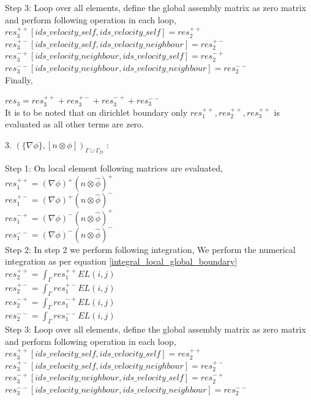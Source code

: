 \documentclass[a4paper]{book}
\begin{document}
Step 3: Loop over all elements, define the global assembly matrix as zero matrix and perform following operation in each loop,
\\
$res_3^{++}[ids\_velocity\_self,ids\_velocity\_self] = res_2^{++}$\\
$res_3^{+-}[ids\_velocity\_self,ids\_velocity\_neighbour] = res_2^{+-}$\\
$res_3^{-+}[ids\_velocity\_neighbour,ids\_velocity\_self] = res_2^{-+}$\\
$res_3^{--}[ids\_velocity\_neighbour,ids\_velocity\_neighbour] = res_2^{--}$\\

Finally,

$res_3 = res_3^{++} + res_3^{+-} + res_3^{-+} + res_3^{--}$\\

It is to be noted that on dirichlet boundary only $res_1^{++}, res_2^{++}, res_3^{++}$ is evaluated as all other terms are zero.

3. $(\lbrace \nabla \phi \rbrace, [n \otimes \phi])_{\Gamma \cup \Gamma_D}$ :

Step 1: On local element following matrices are evaluated,\\

$res_1^{++} = (\nabla \phi)^+ (n \otimes \hat{\phi})^+$\\
$res_1^{+-} = (\nabla \phi)^+ (n \otimes \hat{\phi})^-$\\
$res_1^{-+} = (\nabla \phi)^- (n \otimes \hat{\phi})^+$\\
$res_1^{--} = (\nabla \phi)^- (n \otimes \hat{\phi})^-$\\

Step 2: In step 2 we perform following integration, 
We perform the numerical integration as per equation \ref{integral_local_global_boundary}
\\ 
$res_2^{++} = \int_{\Gamma} res_1^{++} EL(i,j)$\\
$res_2^{+-} = \int_{\Gamma} res_1^{+-} EL(i,j)$\\
$res_2^{-+} = \int_{\Gamma} res_1^{-+} EL(i,j)$\\
$res_2^{--} = \int_{\Gamma} res_1^{--} EL(i,j)$\\

Step 3: Loop over all elements, define the global assembly matrix as zero matrix and perform following operation in each loop,
\\
$res_3^{++}[ids\_velocity\_self,ids\_velocity\_self] = res_2^{++}$\\
$res_3^{+-}[ids\_velocity\_self,ids\_velocity\_neighbour] = res_2^{+-}$\\
$res_3^{-+}[ids\_velocity\_neighbour,ids\_velocity\_self] = res_2^{-+}$\\
$res_3^{--}[ids\_velocity\_neighbour,ids\_velocity\_neighbour] = res_2^{--}$\\
\end{document}
